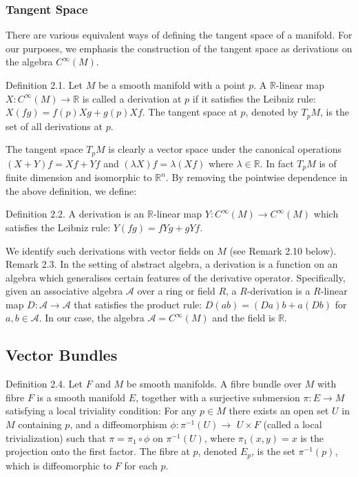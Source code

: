 \documentclass[10pt, letterpaper]{article}
\begin{document}
\subsubsection*{Tangent Space}
There are various equivalent ways of defining the tangent space of a manifold. For our purposes, we emphasis the construction of the tangent space as derivations on the algebra $C^{\infty}(M)$.

Definition 2.1. Let $M$ be a smooth manifold with a point $p$. A $\mathbb{R}$-linear map $X: C^{\infty}(M) \rightarrow \mathbb{R}$ is called a derivation at $p$ if it satisfies the Leibniz rule: $X(f g)=f(p) X g+g(p) X f$. The tangent space at $p$, denoted by $T_{p} M$, is the set of all derivations at $p$.

The tangent space $T_{p} M$ is clearly a vector space under the canonical operations $(X+Y) f=X f+Y f$ and $(\lambda X) f=\lambda(X f)$ where $\lambda \in \mathbb{R}$. In fact $T_{p} M$ is of finite dimension and isomorphic to $\mathbb{R}^{n}$. By removing the pointwise dependence in the above definition, we define:

Definition 2.2. A derivation is an $\mathbb{R}$-linear map $Y: C^{\infty}(M) \rightarrow C^{\infty}(M)$ which satisfies the Leibniz rule: $Y(f g)=f Y g+g Y f$.

We identify such derivations with vector fields on $M$ (see Remark 2.10 below).\\
Remark 2.3. In the setting of abstract algebra, a derivation is a function on an algebra which generalises certain features of the derivative operator. Specifically, given an associative algebra $\mathscr{A}$ over a ring or field $R$, a $R$-derivation is a $R$-linear map $D: \mathscr{A} \rightarrow \mathscr{A}$ that satisfies the product rule: $D(a b)=(D a) b+a(D b)$ for $a, b \in \mathscr{A}$. In our case, the algebra $\mathscr{A}=C^{\infty}(M)$ and the field is $\mathbb{R}$.

\subsection*{Vector Bundles}
Definition 2.4. Let $F$ and $M$ be smooth manifolds. A fibre bundle over $M$ with fibre $F$ is a smooth manifold $E$, together with a surjective submersion $\pi: E \rightarrow M$ satisfying a local triviality condition: For any $p \in M$ there exists an open set $U$ in $M$ containing $p$, and a diffeomorphism $\phi: \pi^{-1}(U) \rightarrow$ $U \times F$ (called a local trivialization) such that $\pi=\pi_{1} \circ \phi$ on $\pi^{-1}(U)$, where $\pi_{1}(x, y)=x$ is the projection onto the first factor. The fibre at $p$, denoted $E_{p}$, is the set $\pi^{-1}(p)$, which is diffeomorphic to $F$ for each $p$.
\end{document}
